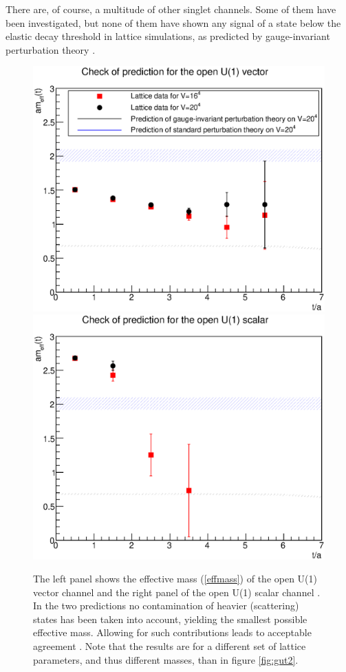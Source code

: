 \documentclass[final,12pt]{article}
\newcommand*{\pref}[1]{(\ref{#1})}
\newcommand*{\1}{1\!\!\!\bot}
\begin{document}
There are, of course, a multitude of other singlet channels. Some of them have been investigated, but none of them have shown any signal of a state below the elastic decay threshold in lattice simulations, as predicted by gauge-invariant perturbation theory \cite{Maas:unpublishedtoerek}.

\begin{figure}
\includegraphics[width=0.5\linewidth]{su3u1openv}\includegraphics[width=0.5\linewidth]{su3u1opens}
\caption{\label{fig:gutu1}The left panel shows the effective mass \pref{effmass} of the open U(1) vector channel and the right panel of the open U(1) scalar channel \cite{Maas:2017pcw,Maas:unpublishedtoerek}. In the two predictions no contamination of heavier (scattering) states has been taken into account, yielding the smallest possible effective mass. Allowing for such contributions leads to acceptable agreement \cite{Maas:unpublishedtoerek}. Note that the results are for a different set of lattice parameters, and thus different masses, than in figure \ref{fig:gut2}.}
\end{figure}
\end{document}

